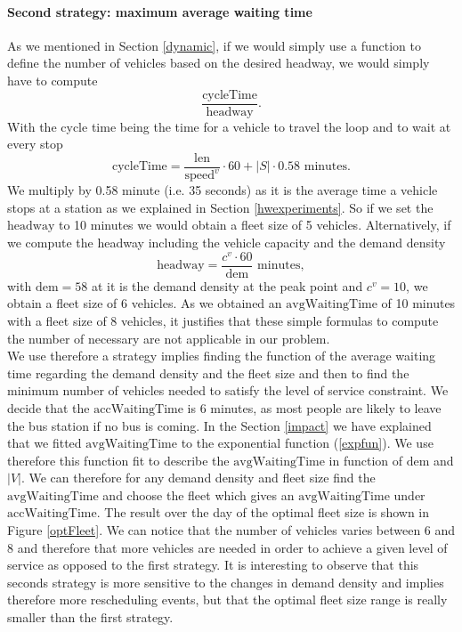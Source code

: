 \documentclass[12pt,a4paper]{article}
\begin{document}
\paragraph{Second strategy: maximum average waiting time}
As we mentioned in Section \ref{dynamic}, if we would simply use a function to define the number of vehicles based on the desired headway, we would simply have to compute $$ \frac{\text{cycleTime}}{\text{headway}}.$$ With the cycle time being the time for a vehicle to travel the loop and to wait at every stop $$\text{cycleTime} = \frac{\text{len}}{\text{speed}^{v}}\cdot 60 + |S| \cdot 0.58\text{ minutes}.$$ We multiply by 0.58 minute (i.e. 35 seconds) as it is the average time a vehicle stops at a station as we explained in Section \ref{hwexperiments}. So if we set the $\text{headway}$ to 10 minutes we would obtain a fleet size of 5 vehicles. Alternatively, if we compute the headway including the vehicle capacity and the demand density $$\text{headway} = \frac{c^{v} \cdot 60}{\text{dem}} \text{ minutes},$$
with $\text{dem} = 58$ at it is the demand density at the peak point and $c^{v}=10$, we obtain a fleet size of 6 vehicles. As we obtained an $\text{avgWaitingTime}$ of 10 minutes with a fleet size of 8 vehicles, it justifies that these simple formulas to compute the number of necessary are not applicable in our problem. 
\\
We use therefore a strategy implies finding the function of the average waiting time regarding the demand density and the fleet size and then to find the minimum number of vehicles needed to satisfy the level of service constraint. We decide that the $\text{accWaitingTime}$ is 6 minutes, as most people are likely to leave the bus station if no bus is coming. In the Section \ref{impact} we have explained that we fitted $\text{avgWaitingTime}$ to the exponential function (\ref{expfun}). We use therefore this function fit to describe the $\text{avgWaitingTime}$ in function of $\text{dem}$ and $|V|$. We can therefore for any demand density and fleet size find the $\text{avgWaitingTime}$ and choose the fleet which gives an $\text{avgWaitingTime}$ under $\text{accWaitingTime}$. The result over the day of the optimal fleet size is shown in Figure \ref{optFleet}. We can notice that the number of vehicles varies between 6 and 8 and therefore that more vehicles are needed in order to achieve a given level of service as opposed to the first strategy. It is interesting to observe that this seconds strategy is more sensitive to the changes in demand density and implies therefore more rescheduling events, but that the optimal fleet size range is really smaller than the first strategy. 
\end{document}
